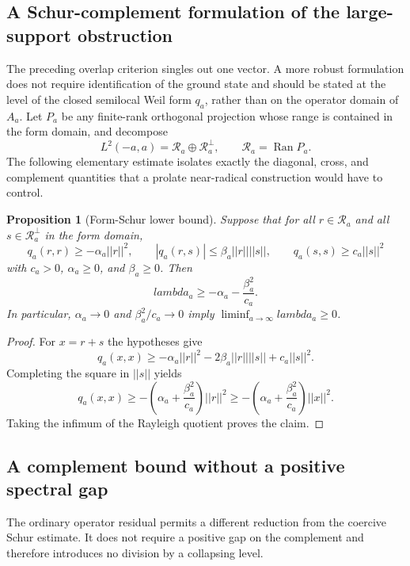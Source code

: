 \documentclass[11pt]{article}
\def\lambda{lambda}%
\def\norm#1{||#1||}%
\newtheorem{proposition}[theorem]{Proposition}
\theoremstyle{remark}
\newcommand{\norm}[1]{\left\lVert #1\right\rVert}
\begin{document}
\subsection{A Schur-complement formulation of the large-support obstruction}
The preceding overlap criterion singles out one vector.  A more robust formulation does not require identification of the ground state and should be stated at the level of the closed semilocal Weil form $q_a$, rather than on the operator domain of $A_a$.  Let $P_a$ be any finite-rank orthogonal projection whose range is contained in the form domain, and decompose
\[
 L^2(-a,a)=\mathcal R_a\oplus\mathcal R_a^\perp,
 \qquad \mathcal R_a=\operatorname{Ran}P_a.
\]
The following elementary estimate isolates exactly the diagonal, cross, and complement quantities that a prolate near-radical construction would have to control.

\begin{proposition}[Form-Schur lower bound]\label{prop:g2-schur}
Suppose that for all $r\in\mathcal R_a$ and all $s\in\mathcal R_a^\perp$ in the form domain,
\[
 q_a(r,r)\ge-\alpha_a\norm r^2,
 \qquad
 |q_a(r,s)|\le\beta_a\norm r\norm s,
 \qquad
 q_a(s,s)\ge c_a\norm s^2
\]
with $c_a>0$, $\alpha_a\ge0$, and $\beta_a\ge0$. Then
\[
 \boxed{
 \lambda_a\ge -\alpha_a-\frac{\beta_a^2}{c_a}.
 }
 \tag{G2.4}
\]
In particular, $\alpha_a\to0$ and $\beta_a^2/c_a\to0$ imply $\liminf_{a\to\infty}\lambda_a\ge0$.
\end{proposition}
\begin{proof}
For $x=r+s$ the hypotheses give
\[
 q_a(x,x)
 \ge -\alpha_a\norm r^2-2\beta_a\norm r\norm s+c_a\norm s^2.
\]
Completing the square in $\norm s$ yields
\[
 q_a(x,x)
 \ge -\left(\alpha_a+\frac{\beta_a^2}{c_a}\right)\norm r^2
 \ge -\left(\alpha_a+\frac{\beta_a^2}{c_a}\right)\norm x^2.
\]
Taking the infimum of the Rayleigh quotient proves the claim.
\end{proof}

\subsection{A complement bound without a positive spectral gap}
The ordinary operator residual permits a different reduction from the
coercive Schur estimate.  It does not require a positive gap on the
complement and therefore introduces no division by a collapsing level.
\end{document}
